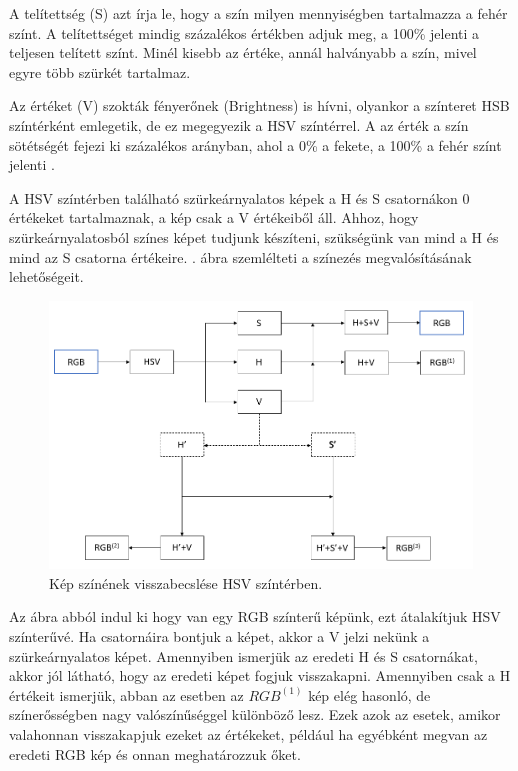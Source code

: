 A telítettség (S) azt írja le, hogy a szín milyen mennyiségben tartalmazza a fehér színt. A telítettséget mindig százalékos értékben adjuk meg, a 100\% jelenti a teljesen telített színt. Minél kisebb az értéke, annál halványabb a szín, mivel egyre több szürkét tartalmaz.

Az értéket (V) szokták fényerőnek (Brightness) is hívni, olyankor a színteret HSB színtérként emlegetik, de ez megegyezik a HSV színtérrel. A az érték a szín sötétségét fejezi ki százalékos arányban, ahol a 0\% a fekete, a 100\% a fehér színt jelenti \cite{colorspaces}.

A HSV színtérben található szürkeárnyalatos képek a H és S csatornákon 0 értékeket tartalmaznak, a kép csak a V értékeiből áll. Ahhoz, hogy szürkeárnyalatosból színes képet tudjunk készíteni, szükségünk van mind a H és mind az S csatorna értékeire. . ábra szemlélteti a színezés megvalósításának lehetőségeit.

\begin{figure}[h]
\centering
\includegraphics[scale=0.5]{images/hsv_colorization.png}
\caption{Kép színének visszabecslése HSV színtérben.}
\label{fig:hsv_colorization}
\end{figure}

Az ábra abból indul ki hogy van egy RGB színterű képünk, ezt átalakítjuk HSV színterűvé. Ha csatornáira bontjuk a képet, akkor a V  jelzi nekünk a szürkeárnyalatos képet. Amennyiben ismerjük az eredeti H és S csatornákat, akkor jól látható, hogy az eredeti képet fogjuk visszakapni. Amennyiben csak a H értékeit ismerjük, abban az esetben az $RGB^{(1)}$ kép elég hasonló, de színerősségben nagy valószínűséggel különböző lesz. Ezek azok az esetek, amikor valahonnan visszakapjuk ezeket az értékeket, például ha egyébként megvan az eredeti RGB kép és onnan meghatározzuk őket.

